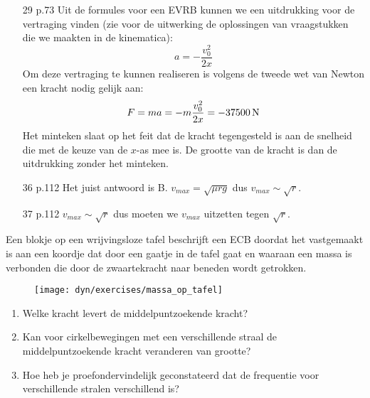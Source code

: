 \documentclass{ximera}
\begin{document}
\begin{exercise}
\begin{oplossing}
\begin{itemize}
\item[29 p.73]Uit de formules voor een EVRB kunnen we een uitdrukking voor de vertraging vinden (zie voor de uitwerking de oplossingen van vraagstukken die we maakten in de kinematica):
\[
a=-\frac{v_0^2}{2x}
\]
Om deze vertraging te kunnen realiseren is volgens de tweede wet van Newton een kracht nodig gelijk aan:
\begin{eqnarray*}
F=ma=-m\frac{v_0^2}{2x}=-37500\rm\,N
\end{eqnarray*}
Het minteken slaat op het feit dat de kracht tegengesteld is aan de snelheid die met de keuze van de $x$-as mee is. De grootte van de kracht is dan de uitdrukking zonder het minteken.
\end{itemize}
\end{oplossing}

\begin{oplossing}
    \begin{itemize}

\item [36 p.112]
Het juist antwoord is B. $v_{max}=\sqrt{\mu rg}$ dus $v_{max}\sim\sqrt{r}$.

\item [37 p.112]
$v_{max}\sim\sqrt{r}$ dus moeten we $v_{max}$ uitzetten tegen
$\sqrt{r}$.
    \end{itemize}
\end{oplossing}



\end{exercise}

\begin{exercise} Een blokje op een wrijvingsloze tafel beschrijft een ECB doordat het vastgemaakt is aan een koordje dat door een
gaatje in de tafel gaat en waaraan een massa is verbonden die door
de zwaartekracht naar beneden wordt getrokken.
\begin{figure}[h]
\begin{center}
\texttt{[image: dyn/exercises/massa\_op\_tafel]}
\end{center}
\end{figure}
\begin{enumerate}
\item Welke kracht levert de middelpuntzoekende kracht?
\item Kan voor cirkelbewegingen met een verschillende straal de
middelpuntzoekende kracht veranderen van grootte?
\item Hoe heb je proefondervindelijk geconstateerd dat de frequentie
voor verschillende stralen verschillend is?
\end{enumerate}

\end{exercise}
\end{document}
